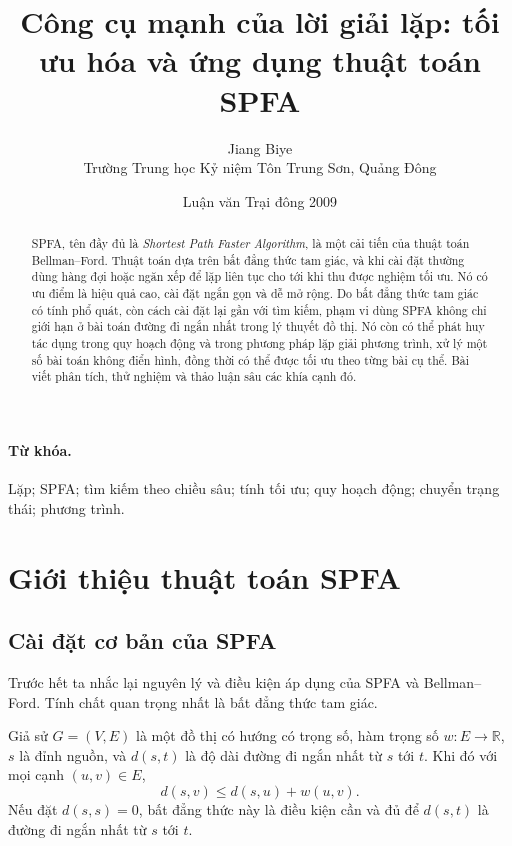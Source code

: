 \documentclass[11pt]{article}
\title{Công cụ mạnh của lời giải lặp: tối ưu hóa và ứng dụng thuật toán SPFA}
\author{Jiang Biye\\Trường Trung học Kỷ niệm Tôn Trung Sơn, Quảng Đông}
\date{Luận văn Trại đông 2009}
\begin{document}
\maketitle


\begin{abstract}
SPFA, tên đầy đủ là \textit{Shortest Path Faster Algorithm}, là một cải
tiến của thuật toán Bellman--Ford. Thuật toán dựa trên bất đẳng thức tam
giác, và khi cài đặt thường dùng hàng đợi hoặc ngăn xếp để lặp liên tục cho
tới khi thu được nghiệm tối ưu. Nó có ưu điểm là hiệu quả cao, cài đặt ngắn
gọn và dễ mở rộng. Do bất đẳng thức tam giác có tính phổ quát, còn cách cài
đặt lại gần với tìm kiếm, phạm vi dùng SPFA không chỉ giới hạn ở bài toán
đường đi ngắn nhất trong lý thuyết đồ thị. Nó còn có thể phát huy tác dụng
trong quy hoạch động và trong phương pháp lặp giải phương trình, xử lý một số
bài toán không điển hình, đồng thời có thể được tối ưu theo từng bài cụ thể.
Bài viết phân tích, thử nghiệm và thảo luận sâu các khía cạnh đó.
\end{abstract}

\paragraph{Từ khóa.}
Lặp; SPFA; tìm kiếm theo chiều sâu; tính tối ưu; quy hoạch động; chuyển trạng
thái; phương trình.

\tableofcontents

\section{Giới thiệu thuật toán SPFA}

\subsection{Cài đặt cơ bản của SPFA}

Trước hết ta nhắc lại nguyên lý và điều kiện áp dụng của SPFA và
Bellman--Ford. Tính chất quan trọng nhất là bất đẳng thức tam giác.

Giả sử \(G=(V,E)\) là một đồ thị có hướng có trọng số, hàm trọng số
\(w:E\to\mathbb{R}\), \(s\) là đỉnh nguồn, và \(d(s,t)\) là độ dài đường đi
ngắn nhất từ \(s\) tới \(t\). Khi đó với mọi cạnh \((u,v)\in E\),
\[
  d(s,v)\le d(s,u)+w(u,v).
\]
Nếu đặt \(d(s,s)=0\), bất đẳng thức này là điều kiện cần và đủ để \(d(s,t)\)
là đường đi ngắn nhất từ \(s\) tới \(t\).
\end{document}
